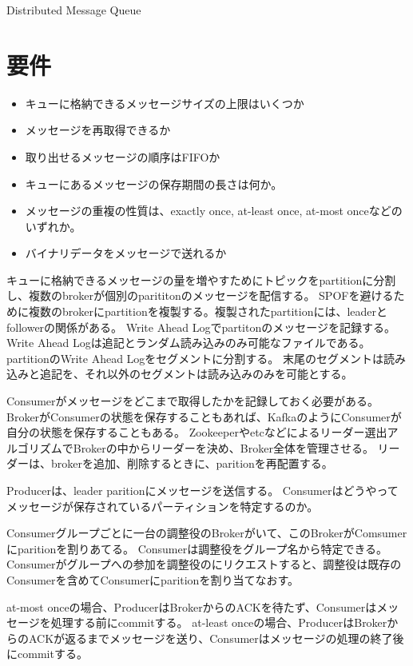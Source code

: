 \documentclass[book]{jlreq}
\begin{document}
\begin{chapter-bib}{Distributed Message Queue}
  \section{要件}
  \begin{itemize}
  \item キューに格納できるメッセージサイズの上限はいくつか
  \item メッセージを再取得できるか
  \item 取り出せるメッセージの順序はFIFOか
  \item キューにあるメッセージの保存期間の長さは何か。
  \item メッセージの重複の性質は、exactly once, at-least once, at-most onceなどのいずれか。
  \item バイナリデータをメッセージで送れるか
  \end{itemize}
  キューに格納できるメッセージの量を増やすためにトピックをpartitionに分割し、複数のbrokerが個別のparititonのメッセージを配信する。
  SPOFを避けるために複数のbrokerにpartitionを複製する。複製されたpartitionには、leaderとfollowerの関係がある。
  Write Ahead Logでpartitonのメッセージを記録する。Write Ahead Logは追記とランダム読み込みのみ可能なファイルである\cite{sdi2}。
  partitionのWrite Ahead Logをセグメントに分割する。
  末尾のセグメントは読み込みと追記を、それ以外のセグメントは読み込みのみを可能とする。
  
  Consumerがメッセージをどこまで取得したかを記録しておく必要がある。
  BrokerがConsumerの状態を保存する\cite{sdi2}こともあれば、KafkaのようにConsumerが自分の状態を保存する\cite{Kreps2011KafkaA}こともある。
  Zookeeperやetcなどによるリーダー選出アルゴリズムでBrokerの中からリーダーを決め、Broker全体を管理させる。
  リーダーは、brokerを追加、削除するときに、paritionを再配置する。
  
  Producerは、leader paritionにメッセージを送信する。
  Consumerはどうやってメッセージが保存されているパーティションを特定するのか。

  Consumerグループごとに一台の調整役のBrokerがいて、このBrokerがComsumerにparitionを割りあてる。
  Consumerは調整役をグループ名から特定できる。
  Consumerがグループへの参加を調整役のにリクエストすると、調整役は既存のConsumerを含めてConsumerにparitionを割り当てなおす。

  at-most onceの場合、ProducerはBrokerからのACKを待たず、Consumerはメッセージを処理する前にcommitする。
  at-least onceの場合、ProducerはBrokerからのACKが返るまでメッセージを送り、Consumerはメッセージの処理の終了後にcommitする。
\end{chapter-bib}
\end{document}
